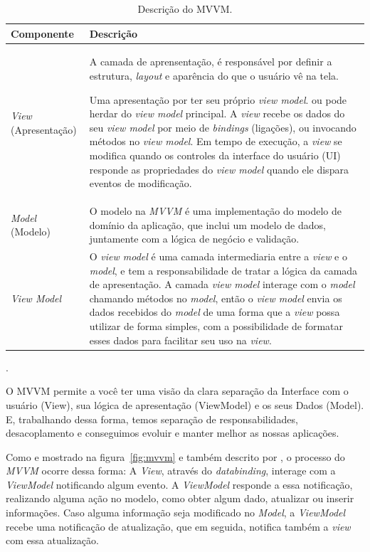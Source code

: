 \begin{table}[htdp]
    \begin{center}
        \begin{tabular}{|l|p{11cm}|}
            \hline \textbf{Componente} & \textbf{Descrição} \\
            \hline \textit{View} (Apresentação) & 
            A camada de aprensentação, é responsável por definir a estrutura, \textit{layout} e aparência do que o usuário vê na tela.
            
            Uma apresentação por ter seu próprio \textit{view model}. ou pode herdar do \textit{view model} principal. A \textit{view} recebe os dados do seu \textit{view model} por meio de \textit{bindings} (ligações), ou invocando métodos no \textit{view model}. Em tempo de execução, a \textit{view} se modifica quando os controles da interface do usuário (UI) responde  as propriedades do \textit{view model} quando ele dispara eventos de modificação.
             \\
            \hline \textit{Model} (Modelo) & 
            O modelo na \textit{MVVM} é uma implementação do modelo de domínio da aplicação, que inclui um modelo de dados, juntamente com a lógica de negócio e validação. \\
            \hline \textit{View Model} & 
            O \textit{view model} é uma camada intermediaria entre a \textit{view} e o \textit{model}, e tem a responsabilidade de tratar a lógica da camada de apresentação. A camada \textit{view model} interage com o \textit{model} chamando métodos no \textit{model}, então o \textit{view model} envia os dados recebidos do \textit{model} de uma forma que a \textit{view} possa utilizar de forma simples, com a possibilidade de formatar esses dados para facilitar seu uso na \textit{view}. \\
            \hline
        \end{tabular}
        \caption{Descrição do \ac{MVVM}.}.
        \label{tbl:mvvm}
    \end{center}
\end{table}

\begin{citacao}
    O MVVM permite a você ter uma visão da clara separação da Interface com o usuário (View), sua lógica de apresentação (ViewModel) e os seus Dados (Model). E, trabalhando dessa forma, temos separação de responsabilidades, desacoplamento e conseguimos evoluir e manter melhor as nossas aplicações. \cite{ferreira_mvvm}
\end{citacao}

Como e mostrado na figura~\ref{fig:mvvm} e também descrito por , o processo do \textit{MVVM} ocorre dessa forma: A \textit{View}, através do \textit{databinding}, interage com a \textit{ViewModel} notificando algum evento. A \textit{ViewModel} responde a essa notificação, realizando alguma ação no modelo, como obter algum dado, atualizar ou inserir informações. Caso alguma informação seja modificado no \textit{Model}, a \textit{ViewModel} recebe uma notificação de atualização, que em seguida, notifica também a \textit{view} com essa atualização. 